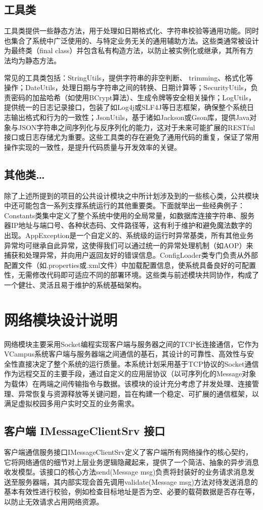 \documentclass[a4paper]{ctexart}
\begin{document}
\subsection{工具类}
工具类提供一些静态方法，用于处理如日期格式化、字符串校验等通用功能。同时也集合了系统中广泛使用的、与特定业务无关的通用辅助方法。这些类通常被设计为最终类（final class）并包含私有构造方法，以防止被实例化或继承，其所有方法均为静态方法。

常见的工具类包括：StringUtils，提供字符串的非空判断、 trimming、格式化等操作；DateUtils，处理日期与字符串之间的转换、日期计算等；SecurityUtils，负责密码的加盐哈希（如使用BCrypt算法）、生成令牌等安全相关操作；LogUtils，提供统一的日志记录接口，包装了如Log4j或SLF4J等日志框架，确保整个系统日志输出格式和行为的一致性；JsonUtils，基于诸如Jackson或Gson库，提供Java对象与JSON字符串之间序列化与反序列化的能力，这对于未来可能扩展的RESTful接口或日志存储尤为重要。这些工具类的存在避免了通用代码的重复，保证了常用操作实现的一致性，是提升代码质量与开发效率的关键。
\subsection{其他类…}
除了上述所提到的项目的公共设计模块之中所计划涉及到的一些核心类，公共模块中还可能包含一系列支撑系统运行的其他重要类。下面就举出一些经典例子：Constants类集中定义了整个系统中使用的全局常量，如数据库连接字符串、服务器IP地址与端口号、各种状态码、文件路径等，这有利于维护和避免魔法数字的出现。AppException是一个自定义的、系统级的运行时异常基类，所有其他业务异常均可继承自此异常，这使得我们可以通过统一的异常处理机制（如AOP）来捕获和处理异常，并向用户返回友好的错误信息。ConfigLoader类专门负责从外部配置文件（如.properties或.xml文件）中加载配置信息，使系统具备良好的可配置性，无需修改代码即可适应不同的部署环境。这些类与前述模块共同协作，构成了一个健壮、灵活且易于维护的系统基础架构。

\section{网络模块设计说明}
网络模块主要采用Socket编程实现客户端与服务器之间的TCP长连接通信，它作为VCampus系统客户端与服务器端之间通信的基石，其设计的可靠性、高效性与安全性直接决定了整个系统的运行质量。本系统计划采用基于TCP协议的Socket通信作为远程交互的主要手段，通过自定义的应用层协议（以可序列化的Message对象为载体）在两端之间传输指令与数据。该模块的设计充分考虑了并发处理、连接管理、异常恢复与资源释放等关键问题，旨在构建一个稳定、可扩展的通信框架，以满足虚拟校园多用户实时交互的业务需求。
\subsection{客户端 IMessageClientSrv 接口}
客户端通信服务接口IMessageClientSrv定义了客户端所有网络操作的核心契约，它将网络通信的细节对上层业务逻辑隐藏起来，提供了一个简洁、抽象的异步消息收发模型。该接口的核心方法send(Message msg)负责将封装好的业务请求消息发送至服务器端，其内部实现会首先调用validate(Message msg)方法对待发送消息的基本有效性进行校验，例如检查目标地址是否为空、必要的载荷数据是否存在等，以防止无效请求占用网络资源。
\end{document}
